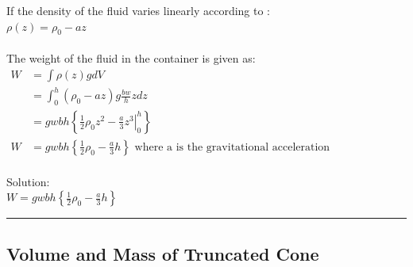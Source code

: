 \documentclass[11pt,a4paper]{article}%
\newcommand{\ETrule}{
\begin{center}%
\rule[2.5pt]{\linewidth}{.5pt}%
\end{center}}%
\begin{document}
If the density of the fluid varies linearly according to : \\ \(\rho(z)=\rho_{0}-a z\)\\\\The weight of the fluid in the container is given as: \\ \(\begin{aligned}W &=\int \rho(z) g d V \\&=\int_{0}^{h}\left(\rho_{0}-a z\right) g \frac{b w}{h} z d z \\&= g w b h \left\{\frac{1}{2} \rho_{0} z^{2}-\left.\frac{a}{3} z^{3}\right|_{0} ^{h}\right\} \\W &=g w b h\left\{\frac{1}{2} \rho_{0}-\frac{a}{3} h\right\} \text { where a is the gravitational acceleration }\end{aligned}\)\\\\Solution:\\\(W=g w b h\left\{\frac{1}{2} \rho_{0}-\frac{a}{3} h\right\}\)\ETrule\subsection{Volume and Mass of Truncated Cone}
\end{document}
